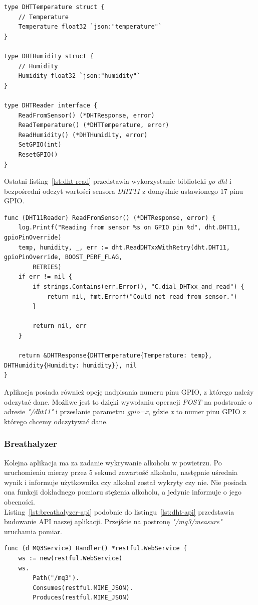 \documentclass[12pt]{report}
\let\Oldsubsubsection\subsubsection
\renewcommand{\subsubsection}{\FloatBarrier\Oldsubsubsection}
\begin{document}
{\begin{lstlisting}[language=golang,caption=Struktury odpowiedzi serwera,label=lst:dht-struct]
type DHTTemperature struct {
	// Temperature
	Temperature float32 `json:"temperature"`
}

type DHTHumidity struct {
	// Humidity
	Humidity float32 `json:"humidity"`
}

type DHTReader interface {
	ReadFromSensor() (*DHTResponse, error)
	ReadTemperature() (*DHTTemperature, error)
	ReadHumidity() (*DHTHumidity, error)
	SetGPIO(int)
	ResetGPIO()
}
\end{lstlisting}

\noindent Ostatni listing~\ref{lst:dht-read} przedstawia wykorzystanie biblioteki \textit{go-dht} i bezpośredni odczyt wartości sensora \textit{DHT11} z domyślnie ustawionego 17 pinu GPIO.
\clearpage
\begin{lstlisting}[language=golang,caption=Odczyt danych z sensora DHT11,label=lst:dht-read]
func (DHT11Reader) ReadFromSensor() (*DHTResponse, error) {
	log.Printf("Reading from sensor %s on GPIO pin %d", dht.DHT11, gpioPinOverride)
	temp, humidity, _, err := dht.ReadDHTxxWithRetry(dht.DHT11, gpioPinOverride, BOOST_PERF_FLAG,
		RETRIES)
	if err != nil {
		if strings.Contains(err.Error(), "C.dial_DHTxx_and_read") {
			return nil, fmt.Errorf("Could not read from sensor.")
		}

		return nil, err
	}

	return &DHTResponse{DHTTemperature{Temperature: temp}, DHTHumidity{Humidity: humidity}}, nil
}
\end{lstlisting}

\noindent Aplikacja posiada również opcję nadpisania numeru pinu GPIO, z którego należy odczytać dane. Możliwe jest to dzięki wywołaniu operacji \textit{POST} na podstronie o adresie \textit{"/dht11"} i przesłanie parametru \textit{gpio=x}, gdzie \textit{x} to numer pinu GPIO z którego chcemy odczytywać dane.

\subsubsection{Breathalyzer} \label{subsect:breathalyzer}
Kolejna aplikacja ma za zadanie wykrywanie alkoholu w powietrzu. Po uruchomieniu mierzy przez 5 sekund zawartość alkoholu, następnie uśrednia wynik i informuje użytkownika czy alkohol został wykryty czy nie. Nie posiada ona funkcji dokładnego pomiaru stężenia alkoholu, a jedynie informuje o jego obecności. \\

\noindent Listing~\ref{lst:breathalyzer-api} podobnie do listingu~\ref{lst:dht-api} przedstawia budowanie API naszej aplikacji. Przejście na postronę \textit{"/mq3/measure"} uruchamia pomiar.
\clearpage
\begin{lstlisting}[language=golang,caption=Konfiguracja API,label=lst:breathalyzer-api]
func (d MQ3Service) Handler() *restful.WebService {
	ws := new(restful.WebService)
	ws.
		Path("/mq3").
		Consumes(restful.MIME_JSON).
		Produces(restful.MIME_JSON)


\end{lstlisting}}
\end{document}
